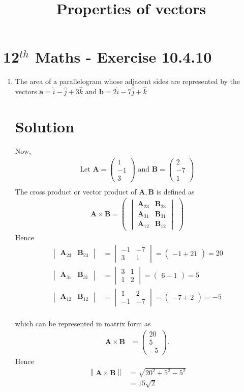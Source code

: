 \documentclass[12pt]{article}
\newcommand{\mydet}[1]{\ensuremath{\begin{vmatrix}#1\end{vmatrix}}}
\providecommand{\norm}[1]{\left\lVert#1\right\rVert}
\newcommand{\myvec}[1]{\ensuremath{\begin{pmatrix}#1\end{pmatrix}}}
\let\vec\mathbf
\begin{document}
\begin{center}
\title{\textbf{Properties of vectors}}
\date{\vspace{-5ex}} %
\maketitle
\end{center}
\setcounter{page}{1}
\section{12$^{th}$ Maths - Exercise 10.4.10}

\begin{enumerate}
\item The area of a parallelogram whose adjacent sides are represented by the vectors $\vec{a}=\hat{i}-\hat{j}+3\hat{k}\text{ and } \vec{b}=2\hat{i}-7\hat{j}+\hat{k}$
\section{Solution}
Now,
\begin{align}
\text{Let } \vec{A} = \myvec{1\\-1\\3} \text{ and } \vec{B} = \myvec{2\\ -7 \\ 1}\\
\end{align}
The cross product or vector product of $\vec{A},\vec{B}$ is defined as
\begin{align}
	\vec{A} \times \vec{B} = \myvec{\mydet{\vec{A}_{23}&\vec{B}_{23}\\\vec{A}_{31}&\vec{B}_{31}\\\vec{A}_{12}&\vec{B}_{12}}}
\end{align}
Hence
\begin{align}
	\mydet{\vec{A}_{23}&\vec{B}_{23}}&=\mydet{-1&-7\\3&1}=\myvec{-1+21}=20\\
	\mydet{\vec{A}_{31}&\vec{B}_{31}}&=\mydet{3&1\\1&2}=\myvec{6-1}=5\\
	\mydet{\vec{A}_{12}&\vec{B}_{12}}&=\mydet{1&2\\-1&-7}=\myvec{-7+2}=-5\\
\end{align}

which can be represented in matrix form as
\begin{align}
	\vec{A} \times \vec{B}&=\myvec{20\\5\\-5}.
\end{align}
Hence
\begin{align}
\norm{\vec{A} \times \vec{B}}&=\sqrt{20^2+5^2-5^2}\\
 &= 15\sqrt{2}
\end{align}

\end{enumerate}
\end{document}
